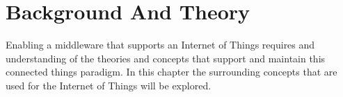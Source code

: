 \chapter{Background And Theory}

Enabling a middleware that supports an Internet of Things requires and understanding of the theories and concepts that support and maintain this connected things paradigm. In this chapter the surrounding concepts that are used for the Internet of Things will be explored. 







